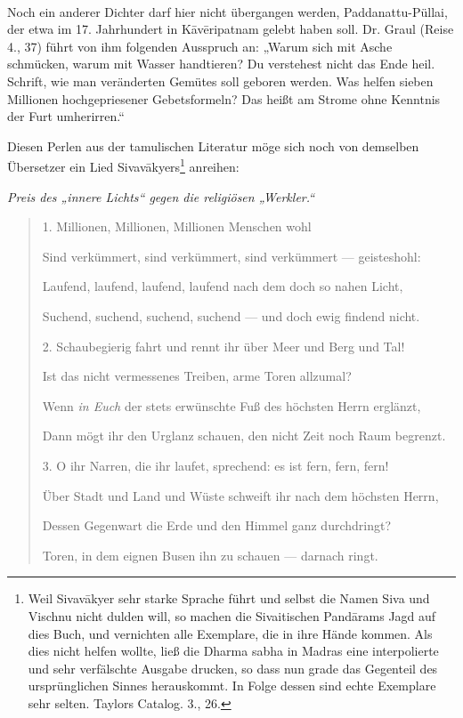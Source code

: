 \documentclass{article}
\begin{document}
\paragraph{}
Noch ein anderer Dichter darf hier nicht übergangen werden, Paddanattu-Püllai, der etwa im 17. Jahrhundert in K\={a}v\={e}ripatnam gelebt haben soll. Dr. Graul (Reise 4., 37) führt von ihm folgenden Ausspruch an: „Warum sich mit Asche schmücken, warum mit Wasser handtieren? Du verstehest nicht das Ende heil. Schrift, wie man veränderten Gemütes soll geboren werden. Was helfen sieben Millionen hochgepriesener Gebetsformeln? Das heißt am Strome ohne Kenntnis der Furt umherirren.“

Diesen Perlen aus der tamulischen Literatur möge sich noch von demselben Übersetzer ein Lied Sivav\={a}kyers\footnote{Weil Sivav\={a}kyer sehr starke Sprache führt und selbst die Namen Siva und Vischnu nicht dulden will, so machen die Sivaitischen Pand\={a}rams Jagd auf dies Buch, und vernichten alle Exemplare, die in ihre Hände kommen. Als dies nicht helfen wollte, ließ die Dharma sabha in Madras eine interpolierte und sehr verfälschte Ausgabe drucken, so dass nun grade das Gegenteil des ursprünglichen Sinnes herauskommt. In Folge dessen sind echte Exemplare sehr selten. Taylors Catalog. 3., 26.} anreihen:
\begin{center}
\emph{Preis des „innere Lichts“ gegen die religiösen „Werkler.“}
\end{center}
\begin{quotation}\small
1. Millionen, Millionen, Millionen Menschen wohl

Sind verkümmert, sind verkümmert, sind verkümmert — geisteshohl:

Laufend, laufend, laufend, laufend nach dem doch so nahen Licht,

Suchend, suchend, suchend, suchend — und doch ewig findend nicht.

\bigskip

2. Schaubegierig fahrt und rennt ihr über Meer und Berg und Tal!

Ist das nicht vermessenes Treiben, arme Toren allzumal?

Wenn \emph{in Euch} der stets erwünschte Fuß des höchsten Herrn erglänzt,

Dann mögt ihr den Urglanz schauen, den nicht Zeit noch Raum begrenzt.

\bigskip

3. O ihr Narren, die ihr laufet, sprechend: es ist fern, fern, fern!

Über Stadt und Land und Wüste schweift ihr nach dem höchsten Herrn,

Dessen Gegenwart die Erde und den Himmel ganz durchdringt?

Toren, in dem eignen Busen ihn zu schauen — darnach ringt.
\end{quotation}
\clearpage
\end{document}
